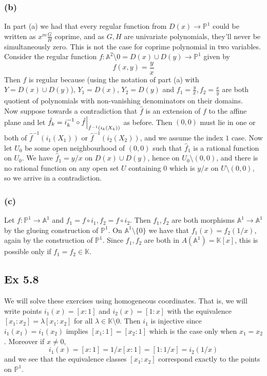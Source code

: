 \documentclass{article}
\newcommand\restr[2]{{%
  \left.\kern-\nulldelimiterspace %
  #1 %
  \vphantom{\big|} %
  \right|_{#2} %
  }}
\theoremstyle{definition}
\newcommand{\K}{\mathbb{K}}
\renewcommand{\P}{\mathbb{P}}
\newcommand{\A}{\mathbb{A}}
\renewcommand{\AA}[1]{\A^{#1}}
\newcommand{\PP}[1]{\P^{#1}}
\begin{document}
\subsubsection*{(b)} 

In part (a) we had that every regular function from $D(x) \to \PP{1}$
could be written as $x^{m} \frac{G}{H}$ coprime, and as $G, H$ are 
univariate polynomials, they'll never be simultaneously zero. This is not
the case for coprime polynomial in two variables. \\

Consider the regular function $f : \AA{2} \setminus 0 = D(x) \cup D(y) \to
\PP{1}$ given by
\[
	f(x, y) = \frac{y}{x}
\] 
Then $f$ is regular because (using the notation of part (a) with $Y = D(x) \cup
D(y)$), $Y_1 = D(x)$, $Y_2 = D(y)$ and $f_1 = \frac{y}{x}, f_2 =
\frac{x}{y}$ are both quotient of polynomials with non-vanishing denominators
on their domains. \\

Now suppose towards a contradiction that $\hat{f}$ is an extension of $f$ to
the affine plane and let $\hat{f}_k = i_{k}^{-1} \circ
\restr{\hat{f}}{\hat{f}^{-1}(i_k(X_k))}$ as before. Then $(0, 0)$ must lie in
one or both of $\hat{f}^{-1}(i_1(X_1))$ or $\hat{f}^{-1}(i_2(X_2))$, and we
assume the index $1$ case. Now let $U_0$ be some open neighbourhood of $(0, 0)$
such that $\hat{f}_1$ is a rational function on $U_0$. We have $\hat{f}_1 = y/x$ on
$D(x) \cup D(y)$, hence on $U_0 \setminus (0, 0)$, and there is no rational
function on any open set $U$ containing $0$ which is $y/x$ on $U \setminus (0,
0)$, so we arrive in a contradiction.

\subsubsection*{(c)} 

Let $f : \PP{1} \to \AA{1}$ and $f_1 = f \circ i_1, f_2 = f \circ i_2$. Then
$f_1, f_2$ are both morphisms $\AA{1} \to \AA{1}$ by the glueing construction
of $\PP{1}$. On $\AA{1} \setminus \{0\}$ we have that $f_1(x) = f_2(1/x)$,
again by the construction of $\PP{1}$. Since $f_1, f_2$ are both in $A(\AA{1})
= \K[x]$, this is possible only if $f_1 = f_2 \in \K$.


\subsection*{Ex 5.8} 

We will solve these exercises using homogeneous coordinates. That is, we will
write points $i_1(x) = [x:1]$ and $i_2(x) = [1:x]$ with the equivalence
$[x_1:x_2] = \lambda [x_1:x_2]$ for all $\lambda \in \K \setminus 0$. Then
$i_1$ is injective since $i_1(x_1) = i_1(x_2)$ implies $[x_1 : 1] = [x_2 : 1]$
which is the case only when $x_1 = x_2$. Moreover if $x \not = 0$,
\[
	i_1(x) = [x:1] = 1/x [x:1] = [1:1/x] = i_2(1/x)
\] 
and we see that the equivalence classes $[x_1:x_2]$ correspond exactly to the
points on $\PP{1}$.
\end{document}
